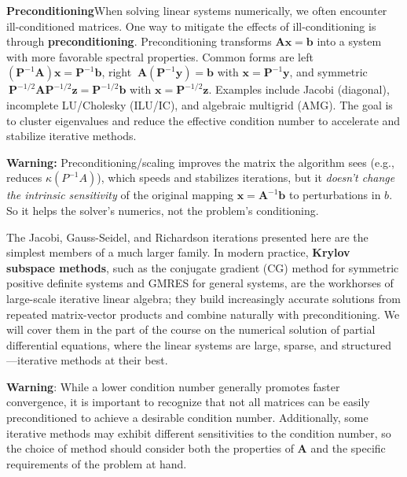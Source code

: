 \textbf{Preconditioning}\quad When solving linear systems numerically, we often encounter ill-conditioned matrices. One way to mitigate the effects of ill-conditioning is through \textbf{preconditioning}. Preconditioning transforms $ \mathbf{A}\mathbf{x} = \mathbf{b} $ into a system with more favorable spectral properties. Common forms are left $(\mathbf{P}^{-1}\mathbf{A})\mathbf{x} = \mathbf{P}^{-1}\mathbf{b}$, right $\ \mathbf{A}(\mathbf{P}^{-1}\mathbf{y}) = \mathbf{b}$ with $\mathbf{x}=\mathbf{P}^{-1}\mathbf{y}$, and symmetric $\ \mathbf{P}^{-1/2}\mathbf{A}\mathbf{P}^{-1/2}\mathbf{z} = \mathbf{P}^{-1/2}\mathbf{b}$ with $\mathbf{x}=\mathbf{P}^{-1/2}\mathbf{z}$. Examples include Jacobi (diagonal), incomplete LU/Cholesky (ILU/IC), and algebraic multigrid (AMG). The goal is to cluster eigenvalues and reduce the effective condition number to accelerate and stabilize iterative methods.

\begin{warningBox}
    \textbf{Warning:} Preconditioning/scaling improves the matrix the algorithm sees (e.g., reduces $\kappa(P^{-1}A)$), which speeds and stabilizes iterations, but it \emph{doesn't change the intrinsic sensitivity} of the original mapping $\mathbf{x}=\mathbf{A}^{-1}\mathbf{b}$ to perturbations in $b$. So it helps the solver's numerics, not the problem's conditioning.
\end{warningBox}

The Jacobi, Gauss-Seidel, and Richardson iterations presented here are the simplest members of a much larger family.
In modern practice, \textbf{Krylov subspace methods}, such as the conjugate gradient (CG) method for symmetric positive definite systems and GMRES for general systems, are the workhorses of large-scale iterative linear algebra; they build increasingly accurate solutions from repeated matrix-vector products and combine naturally with preconditioning.
We will cover them in the part of the course on the numerical solution of partial differential equations, where the linear systems are large, sparse, and structured---iterative methods at their best.

\begin{warningBox}
    \textbf{Warning}: While a lower condition number generally promotes faster convergence, it is important to recognize that not all matrices can be easily preconditioned to achieve a desirable condition number. Additionally, some iterative methods may exhibit different sensitivities to the condition number, so the choice of method should consider both the properties of $\mathbf{A}$ and the specific requirements of the problem at hand.
\end{warningBox}

